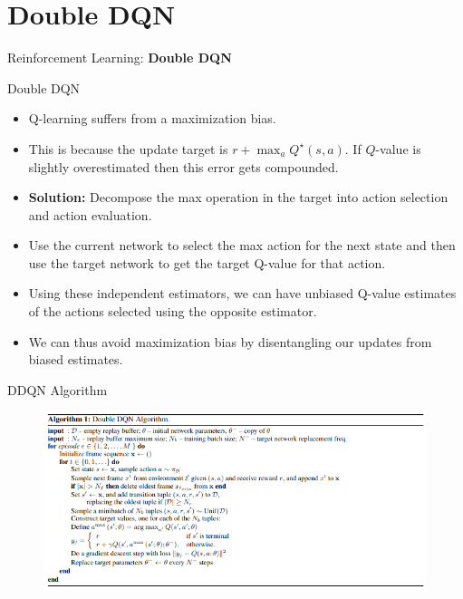 \section{Double DQN}
\begin{frame}{}
    \LARGE Reinforcement Learning: \textbf{Double DQN}
\end{frame}

\begin{frame}{Double DQN}
    \begin{itemize}
        \item Q-learning suffers from a maximization bias.
        \item This is because the update target is $r + \max_a Q^\star(s,a)$. If $Q$-value is slightly overestimated then this error gets compounded.
        \pause
        \item \textbf{Solution:} Decompose the max operation in the target into action selection and action evaluation.
        \item Use the current network to select the max action for the next state and then use the target network to get the target Q-value for that action.
        \item Using these independent estimators, we can have unbiased Q-value estimates of the actions selected using the opposite estimator.
        \item We can thus avoid maximization bias by disentangling our updates from biased estimates.
    \end{itemize}
\end{frame}

\begin{frame}{DDQN Algorithm}
    \begin{figure}
        \centering
        \includegraphics[width=\textwidth,height=0.9\textheight,keepaspectratio]{images/dqn+sarsa/ddqn.png}
    \end{figure}
\end{frame}